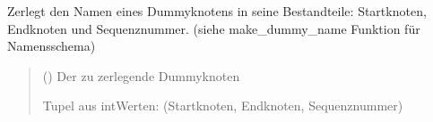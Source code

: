 \documentclass[a4paper,10pt,ngerman]{sphinxmanual}
\begin{document}
\begin{fulllineitems}
\label{\detokenize{api:src.crossing_minimization.parse_dummy_name}}
\pysigstartsignatures
\pysiglinewithargsret
{}
{}
{}
\pysigstopsignatures
\sphinxAtStartPar
Zerlegt den Namen eines Dummyknotens in seine Bestandteile: Startknoten, Endknoten und Sequenznummer. (siehe make\_dummy\_name Funktion für Namensschema)
\begin{quote}\begin{description}
\sphinxAtStartPar
{} () \textendash{} Der zu zerlegende Dummyknoten

\sphinxAtStartPar
Tupel aus int\sphinxhyphen{}Werten: (Startknoten, Endknoten, Sequenznummer)

\sphinxAtStartPar
{}

\end{description}\end{quote}

\end{fulllineitems}

\end{document}
